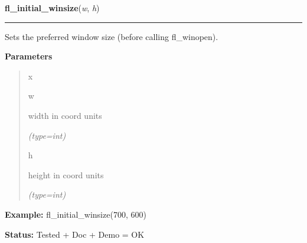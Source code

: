 \hspace{.8\funcindent}\begin{boxedminipage}{\funcwidth}

    \raggedright \textbf{fl\_initial\_winsize}(\textit{w}, \textit{h})

    \vspace{-1.5ex}

    \rule{\textwidth}{0.5\fboxrule}
\setlength{\parskip}{2ex}
    Sets the preferred window size (before calling fl\_winopen).

\setlength{\parskip}{1ex}
      \textbf{Parameters}
      \vspace{-1ex}

      \begin{quote}
        \begin{Ventry}{x}

          \item[w]

          width in coord units

            {\it (type=int)}

          \item[h]

          height in coord units

            {\it (type=int)}

        \end{Ventry}

      \end{quote}

\textbf{Example:} fl\_initial\_winsize(700, 600)



\textbf{Status:} Tested + Doc + Demo = OK



    \end{boxedminipage}

    \label{xformslib:flxbasic:fl_initial_winstate}

    \vspace{0.5ex}

